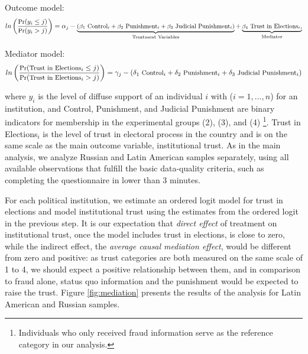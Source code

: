 \documentclass[11pt, ngerman,english,a4]{article}
\begin{document}
\noindent Outcome model:
\begin{equation}
	\small
	ln \left (\frac{\text{Pr}(y_i \leq j)}{\text{Pr}(y_i > j)} \right) = \alpha_j - \underbrace{
		({\beta_1} {\text{ Control}_i} + 
		\beta_2 {\text{ Punishment}_i} + 
		\beta_3 {\text{ Judicial Punishment}_i})
		}_{\text{Treatment Variables}} +
	\underbrace{\beta_4 \text{ Trust in Elections}_i,}_{
		\text{Mediator}}
\end{equation}

\noindent Mediator model:
\begin{equation}
	\small
	ln \left (\frac{\text{Pr}(\text{Trust in Elections}_i \leq j)}{\text{Pr}(\text{Trust in Elections}_i > j)} \right) =\gamma_j - 
	({\delta_1} {\text{ Control}_i} + 
	\delta_2 {\text{ Punishment}_i} + 
	\delta_3 {\text{ Judicial Punishment}_i})
\end{equation}


\noindent where $y_i$ is the level of diffuse support of an individual $i$ with ($i=1,...,n$) for an institution, and Control, Punishment, and Judicial Punishment are binary indicators for membership in the experimental groups (2),  (3), and (4) \footnote{Individuals who only received fraud information serve as the reference category in our analysis.}. Trust in Elections$_i$ is the level of trust in electoral process in the country and is on the same scale as the main outcome variable, institutional trust. As in the main analysis, we analyze Russian and Latin American samples separately, using all available observations that fulfill the basic data-quality criteria, such as completing the questionnaire in lower than 3 minutes.
    
For each political institution, we estimate an ordered logit model for trust in elections and model institutional trust using the estimates from the ordered logit in the previous step. It is our expectation that \textit{direct effect} of treatment on institutional trust, once the model includes trust in elections, is close to zero, while the indirect effect, the \textit{average causal mediation effect}, would be different from zero and positive: as trust categories are both measured on the same scale of 1 to 4, we should expect a positive relationship between them, and in comparison to fraud alone, status quo information and the punishment would be expected to raise the trust. Figure \ref{fig:mediation} presents the results of the analysis for Latin American and Russian samples. 
\end{document}
